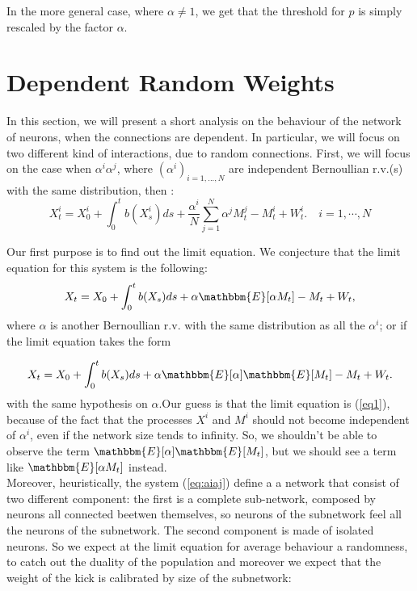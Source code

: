 In the more general case, where $\alpha\neq 1$, we get that the threshold for $p$ is simply rescaled by the factor $\alpha$.

\section{Dependent Random Weights}
In this section, we will present a short analysis on the behaviour of the network of neurons, when the connections are dependent. In particular, we will focus on two different kind of interactions, due to random connections.
First, we will focus on the case when $\alpha^i \alpha^j$, where $(\alpha^i)_{i = 1, ..., N}$ are independent Bernoullian r.v.(s) with the same distribution, then :
\begin{equation}
 X^i_t = X^i_0 + \int_0^t b(X^i_s) ds + \frac{\alpha^i}{N} \sum_{j = 1}^N \alpha^{j} M^j_t - M^i_t + W^i_t. \quad  i=1,\cdots,N\label{eq:aiaj}
 \end{equation}
 
Our first purpose is to find out the limit equation. We conjecture that the limit equation for this system is the following:
\begin{equation} \label{eq1} X_t = X_0 + \int_0^t b(X_s) ds + \alpha \mathbbm{E}[\alpha M_t] - M_t + W_t, \end{equation} where $\alpha$ is another Bernoullian r.v. with the same distribution as all the $\alpha^{i}$; or if the limit equation takes the form 

\begin{equation} \label{eq2} X_t = X_0 + \int_0^t b(X_s) ds + \alpha \mathbbm{E}[\alpha] \mathbbm{E}[M_t] - M_t + W_t. 
\end{equation}
with the same hypothesis on $\alpha$.Our guess is that the limit equation is (\ref{eq1}), because of the fact that the processes $X^i$ and $M^i$ should not become independent of $\alpha^i$, even if the network size tends to infinity. So, we shouldn't be able to observe the term $\mathbbm{E}[\alpha]\mathbbm{E}[M_t]$, but we should see a term like $\mathbbm{E}[\alpha M_t]$ instead. \\

Moreover, heuristically, the system (\ref{eq:aiaj}) define a a network that consist of two different component: the first is a complete sub-network, composed by neurons all connected beetwen themselves, so neurons of the subnetwork feel all the neurons of the subnetwork. The second component is  made of isolated neurons. So we expect at the limit equation for average behaviour a randomness, to catch out the duality of the population and moreover we expect that the weight of the kick is calibrated by size of the subnetwork:

